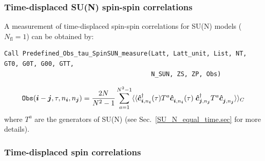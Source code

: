 \subsubsection{Time-displaced SU(N) spin-spin correlations}


A measurement of time-displaced spin-spin correlations for SU(N) models ($N_\text{fl} = 1$) can be obtained by:
\begin{lstlisting}[style=fortran]
Call Predefined_Obs_tau_SpinSUN_measure(Latt, Latt_unit, List, NT, GT0, G0T, G00, GTT, 
                                        N_SUN, ZS, ZP, Obs)
\end{lstlisting}
\begin{align}
\texttt{Obs}(\ve{i} - \ve{j}, \tau, n_{\ve{i}},  n_{\ve{j}} )= \frac{2N}{N^2-1}\sum_{a=1}^{N^2 - 1}  \langle \langle \ve{\hat{c}}^{\dagger}_{\ve{i}, n_{\ve{i}}}(\tau) T^a \ve{\hat{c}}^{\phantom\dagger}_{\ve{i}, n_{\ve{i}}}(\tau)  \;
    \ve{\hat{c}}^{\dagger}_{\ve{j}, n_{\ve{j}}} T^a \ve{\hat{c}}^{\phantom\dagger}_{\ve{j}, n_{\ve{j}}}    \rangle  \rangle_{C}
\end{align}
where $T^a$ are the generators of SU(N) (see Sec.~\ref{SU_N_equal_time.sec}  for more details).


\subsubsection{Time-displaced spin correlations}

